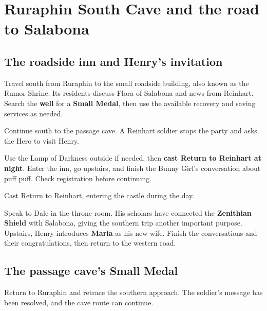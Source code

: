 \section{Ruraphin South Cave and the road to Salabona}

\subsection*{The roadside inn and Henry's invitation}

Travel south from Ruraphin to the small roadside building, also known
as the Rumor Shrine. Its residents discuss Flora of Salabona and news
from Reinhart. Search the \textbf{well} for a \textbf{Small Medal},
then use the available recovery and saving services as needed.

Continue south to the passage cave. A Reinhart soldier stops the party
and asks the Hero to visit Henry.


Use the Lamp of Darkness outside if needed, then \textbf{cast Return to
Reinhart at night}. Enter the inn, go upstairs, and finish the Bunny Girl's
conversation about puff puff. Check registration before continuing.


Cast Return to Reinhart, entering
the castle during the day.

Speak to Dale in the throne room. His scholars have connected the
\textbf{Zenithian Shield} with Salabona, giving the southern trip
another important purpose. Upstairs, Henry introduces \textbf{Maria}
as his new wife. Finish the conversations and their congratulations,
then return to the western road.

\subsection*{The passage cave's Small Medal}

Return to Ruraphin and retrace the southern approach. The soldier's
message has been resolved, and the cave route can continue.

